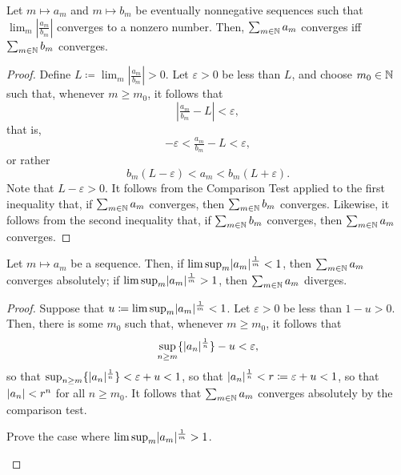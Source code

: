 \begin{prp}\label{prpLimitComparisonTest}
Let $m\mapsto a_m$ and $m\mapsto b_m$ be eventually nonnegative sequences such that $\lim _m\left| \frac{a_m}{b_m}\right|$ converges to a nonzero number.  Then, $\sum _{m\in \mathbb{N}}a_m$ converges iff $\sum _{m\in \mathbb{N}}b_m$ converges.
\begin{proof}
Define $L\coloneqq \lim _m\left| \frac{a_m}{b_m}\right| >0$.  Let $\varepsilon >0$ be less than $L$, and choose $m_0\in \mathbb{N}$ such that, whenever $m\geq m_0$, it follows that
\begin{equation}
\left| \tfrac{a_m}{b_m}-L\right| <\varepsilon ,
\end{equation}
that is,
\begin{equation}
-\varepsilon <\tfrac{a_m}{b_m}-L<\varepsilon ,
\end{equation}
or rather
\begin{equation}
b_m(L-\varepsilon )<a_m<b_m(L+\varepsilon ).
\end{equation}
Note that $L-\varepsilon >0$.  It follows from the Comparison Test applied to the first inequality that, if $\sum _{m\in \mathbb{N}}a_m$ converges, then $\sum _{m\in \mathbb{N}}b_m$ converges.  Likewise, it follows from the second inequality that, if $\sum _{m\in \mathbb{N}}b_m$ converges, then $\sum _{m\in \mathbb{N}}a_m$ converges.
\end{proof}
\end{prp}
\begin{prp}
Let $m\mapsto a_m$ be a sequence.  Then, if $\lim \sup _m\lvert a_m\rvert^{\frac{1}{m}}<1$, then $\sum _{m\in \mathbb{N}}a_m$ converges absolutely; if $\lim \sup _m\lvert a_m\rvert^{\frac{1}{m}}>1$, then $\sum _{m\in \mathbb{N}}a_m$ diverges.
\begin{proof}
Suppose that $u\coloneqq \lim \sup _m\lvert a_m\rvert^{\frac{1}{m}}<1$.  Let $\varepsilon >0$ be less than $1-u>0$.  Then, there is some $m_0$ such that, whenever $m\geq m_0$, it follows that
\begin{equation}
\sup _{n\geq m}\{ \lvert a_n\rvert^{\frac{1}{n}}\} -u<\varepsilon ,
\end{equation}
so that $\sup _{n\geq m}\{ \lvert a_n\rvert^{\frac{1}{n}}\} <\varepsilon +u<1$, so that $\lvert a_n\rvert^{\frac{1}{n}}<r\coloneqq \varepsilon +u<1$, so that $\lvert a_n\rvert<r^n$ for all $n\geq m_0$.  It follows that $\sum _{m\in \mathbb{N}}a_m$ converges absolutely by the comparison test.

\begin{exr}
Prove the case where $\lim \sup _m\lvert a_m\rvert^{\frac{1}{m}}>1$.
\end{exr}
\end{proof}
\end{prp}
